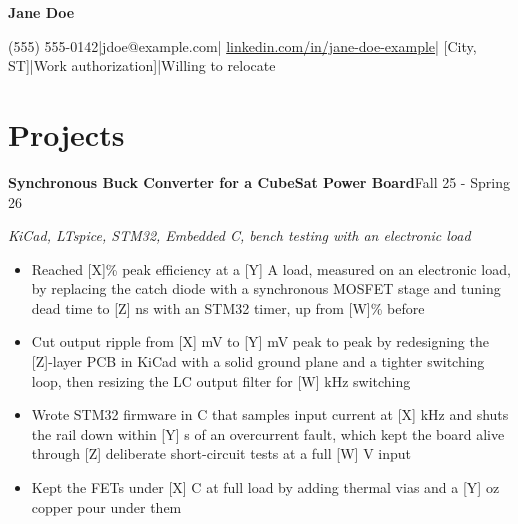 \documentclass[letterpaper,11pt]{article}
\newlength{\itemgap}           %
\newcommand{\entry}[2]{\textbf{#1}\hfill #2\par}
\newcommand{\skillsused}[1]{\textit{#1}\par}
\newcommand{\sep}{\hspace{0.35em}|\hspace{0.35em}}
\begin{document}
{\LARGE\bfseries Jane Doe}\par
\vspace{2pt}
{\fontsize{9.5}{11.5}\selectfont (555) 555-0142\sep jdoe@example.com\sep
\href{https://linkedin.com/in/jane-doe-example}{linkedin.com/in/jane-doe-example}\sep
{[}City, ST{]}\sep {[}Work authorization{]}\sep Willing to relocate\par}


\section{Projects}

\entry{Synchronous Buck Converter for a CubeSat Power Board}{Fall 25 - Spring 26}
\skillsused{KiCad, LTspice, STM32, Embedded C, bench testing with an electronic load}
\begin{itemize}
  \item Reached [X]\% peak efficiency at a [Y] A load, measured on an electronic load, by replacing the catch diode with a synchronous MOSFET stage and tuning dead time to [Z] ns with an STM32 timer, up from [W]\% before
  \item Cut output ripple from [X] mV to [Y] mV peak to peak by redesigning the [Z]-layer PCB in KiCad with a solid ground plane and a tighter switching loop, then resizing the LC output filter for [W] kHz switching
  \item Wrote STM32 firmware in C that samples input current at [X] kHz and shuts the rail down within [Y] \textmu s of an overcurrent fault, which kept the board alive through [Z] deliberate short-circuit tests at a full [W] V input
  \item Kept the FETs under [X] \textdegree{}C at full load by adding thermal vias and a [Y] oz copper pour under them
\end{itemize}
\vspace{\itemgap}
\end{document}
